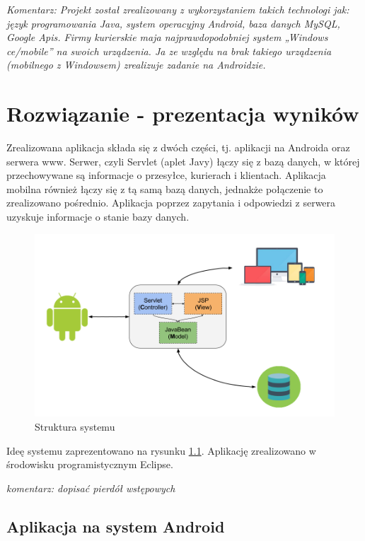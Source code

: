 \documentclass[eng,printmode,oneside]{mgr}
\begin{document}
\emph{\color{komentarz}
Komentarz: Projekt został zrealizowany z wykorzystaniem takich
technologi jak: język programowania Java, system operacyjny Android, baza danych
MySQL, Google Apis. Firmy kurierskie maja najprawdopodobniej system „Windows
ce/mobile” na swoich urządzenia. Ja ze względu na brak takiego urządzenia
(mobilnego z Windowsem) zrealizuje zadanie na Androidzie.
}


\chapter{Rozwiązanie - prezentacja wyników}

Zrealizowana aplikacja składa się z dwóch części, tj. aplikacji na Androida oraz
serwera www. Serwer, czyli Servlet (aplet Javy) łączy się z bazą
danych, w której przechowywane są informacje o przesyłce, kurierach i
klientach. Aplikacja mobilna również łączy się z tą samą bazą danych,
jednakże połączenie to zrealizowano pośrednio. Aplikacja poprzez zapytania i odpowiedzi z
serwera uzyskuje informacje o stanie bazy danych. 

\begin{figure}[h]
\centering
\includegraphics[width=100ex]{StrukturaSystemu.png}
\caption{Struktura systemu}
\label{StrukturaSystemu}
\end{figure}

Ideę systemu zaprezentowano na rysunku \ref{StrukturaSystemu}.
Aplikację zrealizowano w środowisku programistycznym Eclipse.

\emph{\color{komentarz} komentarz: dopisać pierdół wstępowych}

\newpage
\section{Aplikacja na system Android}
\end{document}
